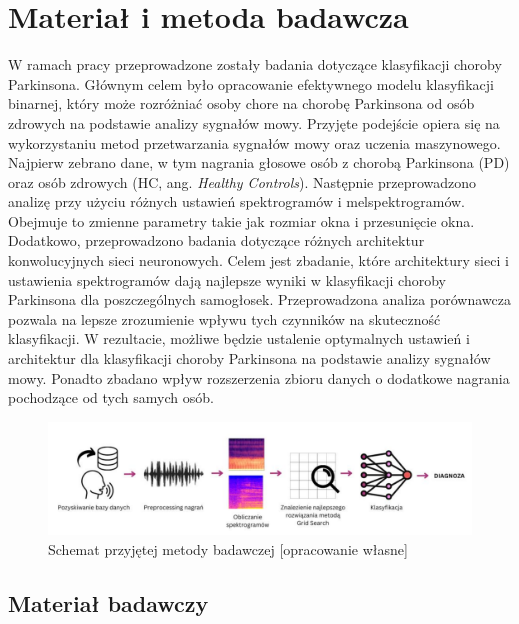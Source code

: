 \chapter{Materiał i metoda badawcza}

W ramach pracy przeprowadzone zostały badania dotyczące klasyfikacji choroby Parkinsona.
Głównym celem było opracowanie efektywnego modelu klasyfikacji binarnej, który może rozróżniać
osoby chore na chorobę Parkinsona od osób zdrowych na podstawie analizy sygnałów mowy.
Przyjęte podejście opiera się na wykorzystaniu metod przetwarzania sygnałów mowy oraz
uczenia maszynowego. Najpierw zebrano dane, w tym nagrania głosowe osób z chorobą Parkinsona
(PD) oraz osób zdrowych (HC, ang. \emph{Healthy Controls}). Następnie przeprowadzono analizę przy użyciu różnych ustawień
spektrogramów i melspektrogramów. Obejmuje to zmienne parametry takie jak rozmiar okna i
przesunięcie okna. Dodatkowo, przeprowadzono badania dotyczące różnych architektur
konwolucyjnych sieci neuronowych. Celem jest zbadanie, które architektury sieci i ustawienia
spektrogramów dają najlepsze wyniki w klasyfikacji choroby Parkinsona dla poszczególnych
samogłosek. Przeprowadzona analiza porównawcza pozwala na lepsze zrozumienie wpływu tych
czynników na skuteczność klasyfikacji. W rezultacie, możliwe będzie ustalenie optymalnych ustawień i
architektur dla klasyfikacji choroby Parkinsona na podstawie analizy sygnałów mowy. Ponadto zbadano
wpływ rozszerzenia zbioru danych o dodatkowe nagrania pochodzące od tych samych osób.

\begin{figure}[htbp]
	\centering
	\includegraphics[width=1\textwidth]{./img/methodology}
	\caption{Schemat przyjętej metody badawczej [opracowanie własne]}
    \label{fig:methodology}
\end{figure}


\section{Materiał badawczy}
\label{sec:material-badawczy}

